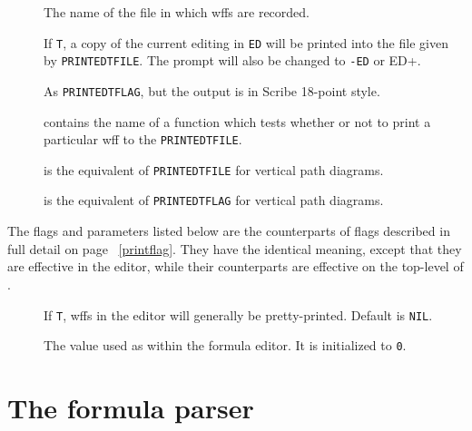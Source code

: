 \begin{description}
\item []  The name of the file in which wffs are recorded.

\item [] 
If {\tt T}, a copy of the current editing in {\tt ED} will be printed into
the file given by {\tt PRINTEDTFILE}. The prompt will also be changed to {\tt -ED}
or {\tt }ED+.

\item []  As {\tt PRINTEDTFLAG}, but the output is
in Scribe 18-point style.

\item []  contains the name of a function which tests whether
or not to print a particular wff to the {\tt PRINTEDTFILE}.

\item []  is the equivalent of {\tt PRINTEDTFILE} for vertical
path diagrams.

\item []  is the equivalent of {\tt PRINTEDTFLAG} for
vertical path diagrams.
\end{description}
The flags and parameters listed below
are the counterparts of flags described in full detail on page
~\ref{printflag}.  They have the identical meaning, except that they
are effective in the editor, while their counterparts are effective on
the top-level of \tps.
\begin{description}
\item [] 
If {\tt T}, wffs in the editor will generally be pretty-printed.  Default is {\tt NIL}.

\item [] 
The value used as  within the formula editor.  It is 
initialized to {\tt 0}.

\end{description}

\section{The formula parser}


